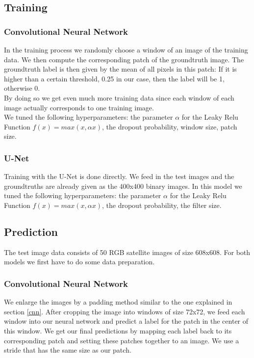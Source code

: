 \documentclass[10pt,conference,compsocconf]{IEEEtran}
\begin{document}
\subsection{Training}
\label{training}

\subsubsection{Convolutional Neural Network}
In the training process we randomly choose a window of an image of the training data. We then compute the corresponding patch of the groundtruth image. The groundtruth label is then given by the mean of all pixels in this patch: If it is higher than a certain threshold, 0.25 in our case, then the label will be 1, otherwise 0.\\
By doing so we get even much more training data since each window of each image actually  corresponds to one training image. \\We tuned the following hyperparameters: the parameter  $\alpha$ for the Leaky Relu Function $f(x)=max(x,\alpha x)$, the dropout probability, window size, patch size. \\

\subsubsection{U-Net}
Training with the U-Net is done directly. We feed in the test images and the groundtruths are already given as the 400x400 binary images. In this model we tuned the following hyperparameters: the parameter  $\alpha$ for the Leaky Relu Function $f(x)=max(x,\alpha x)$, the dropout probability, the filter size. \\

\subsection{Prediction}
The test image data consists of 50 RGB satellite images of size 608x608. For both models we first have to do some data preparation.\\

\subsubsection{Convolutional Neural Network}
We enlarge the images by a padding method similar to the one explained in section \ref{cnn}. After cropping the image into windows of size 72x72, we feed each window into our neural network and predict a label for the patch in the center of this window. We get our final predictions by mapping each label back to its corresponding patch and setting these patches together to an image.
We use a stride that has the same size as our patch. \\
\end{document}
